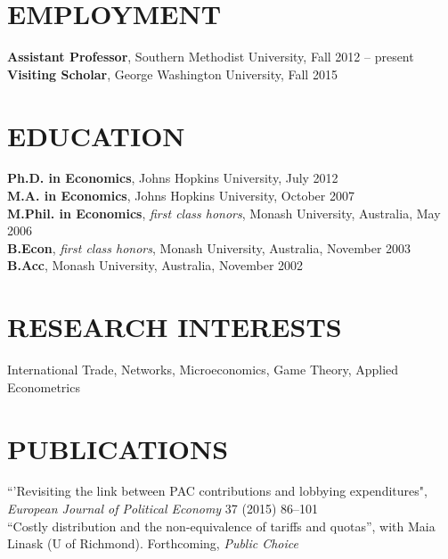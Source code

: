 \documentclass[11pt]{res}
\begin{document}
\begin{resume}
\hspace{-0.5in}\makebox[6.1in]{\hrulefill}

\section{EMPLOYMENT} \vspace{1.5mm}
{\bf Assistant Professor}, Southern Methodist University, Fall 2012 -- present\vspace{.5mm}\\
{\bf Visiting Scholar}, George Washington University, Fall 2015


\section{EDUCATION} \vspace{1.5mm}
    {\bf Ph.D. in Economics}, Johns Hopkins University, July 2012 \vspace{.5mm}\\
    {\bf M.A. in Economics}, Johns Hopkins University, October 2007\vspace{1.5mm}\\
    {\bf M.Phil. in Economics}, \emph{first class honors}, Monash University, Australia, May 2006\vspace{1.5mm}\\
    {\bf B.Econ}, \emph{first class honors}, Monash University, Australia, November 2003\vspace{1.5mm}\\
    {\bf B.Acc}, Monash University, Australia, November 2002


\section{RESEARCH INTERESTS}\vspace{1.5mm}
International Trade, Networks, Microeconomics, Game Theory, Applied Econometrics

\section{PUBLICATIONS}\vspace{1.5mm}
{``'Revisiting the link between PAC contributions and lobbying expenditures", \emph{European Journal of Political Economy}} 37 (2015) 86--101 \vspace{1.5mm}\\
{``Costly distribution and the non-equivalence of tariffs and quotas''}, with Maia Linask (U of Richmond). Forthcoming,  \emph{Public Choice}\vspace{1.5mm}\\


\end{resume}
\end{document}
